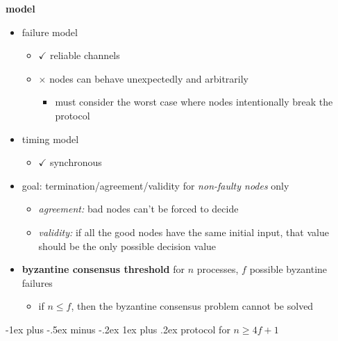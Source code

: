 \documentclass[10pt, landscape]{article}
\makeatletter
\renewcommand{\subsubsection}{\@startsection{subsubsection}{3}{0mm}%
  {-1ex plus -.5ex minus -.2ex}%
  {1ex plus .2ex}%
{\normalfont\small\bfseries}}%
\makeatother
\begin{document}
\begin{multicols*}{3}
  \textbf{model}

  \begin{itemize}
    \item failure model
      \begin{itemize}
        \item $\checkmark$ reliable channels
        \item $\times$  nodes can behave unexpectedly and arbitrarily
          \begin{itemize}
            \item must consider the worst case where nodes intentionally break the protocol
          \end{itemize}
      \end{itemize}
    \item timing model
      \begin{itemize}
        \item $\checkmark$ synchronous
      \end{itemize}
    \item goal: termination/agreement/validity for \textit{non-faulty nodes} only
      \begin{itemize}
        \item \textit{agreement:} bad nodes can't be forced to decide
        \item \textit{validity:} if all the good nodes have the same initial input, that value should be the only possible decision value 
      \end{itemize}
    \item \textbf{byzantine consensus threshold} for $n$ processes, $f$ possible byzantine failures
      \begin{itemize}
        \item if $n \leq f$, then the byzantine consensus problem cannot be solved
      \end{itemize}
  \end{itemize}

  \subsubsection{protocol for $n \geq 4f+1$}


\end{multicols*}
\end{document}

